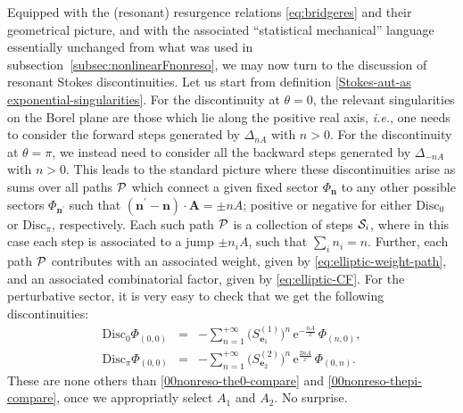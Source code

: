\documentclass[11pt,a4paper]{article}
\newcommand{\CP}{{\cal P}}
\newcommand{\CS}{{\cal S}}
\def\disc{{\mathrm{Disc}}}
\begin{document}
Equipped with the (resonant) resurgence relations \eqref{eq:bridgeres} and their geometrical picture, and with the associated ``statistical mechanical'' language essentially unchanged from what was used in subsection~\ref{subsec:nonlinearFnonreso}, we may now turn to the discussion of resonant Stokes discontinuities. Let us start from definition \eqref{Stokes-aut-as exponential-singularities}. For the discontinuity at $\theta=0$, the relevant singularities on the Borel plane are those which lie along the positive real axis, \textit{i.e.}, one needs to consider the forward steps generated by $\Delta_{nA}$ with $n>0$. For the discontinuity at $\theta=\pi$, we instead need to consider all the backward steps generated by $\Delta_{-nA}$ with $n>0$. This leads to the standard picture where these discontinuities arise as sums over all paths $\CP$ which connect a given fixed sector $\Phi_{\boldsymbol{n}}$ to any other possible sectors $\Phi_{\boldsymbol{n}^{\prime}}$ such that $\left( \boldsymbol{n}^{\prime}-\boldsymbol{n} \right) \cdot \boldsymbol{A} = \pm nA$; positive or negative for either $\disc_0$ or $\disc_\pi$, respectively. Each such path $\CP$ is a collection of steps $\CS_i$, where in this case each step is associated to a jump $\pm n_i A$, such that $\sum_i n_i = n$. Further, each path $\CP$ contributes with an associated weight, given by \eqref{eq:elliptic-weight-path}, and an associated combinatorial factor, given by \eqref{eq:elliptic-CF}. For the perturbative sector, it is very easy to check that we get the following discontinuities:
%
\begin{eqnarray}
\label{ell-pert-disc-0}
\disc_0 \Phi_{(0,0)} &=& - \sum_{n=1}^{+\infty} \big( S^{(1)}_{\boldsymbol{e}_1} \big)^n\, \mathrm{e}^{-\frac{n A}{x}}\, \Phi_{(n,0)}, \\
\label{ell-pert-disc-pi}
\disc_\pi \Phi_{(0,0)} &=& - \sum_{n=1}^{+\infty} \big( S^{(2)}_{\boldsymbol{e}_2} \big)^n\, \mathrm{e}^{\frac{2 n A}{x}}\, \Phi_{(0,n)}.
\end{eqnarray}
%
\noindent
These are none others than \eqref{00nonreso-the0-compare} and \eqref{00nonreso-thepi-compare}, once we appropriatly select $A_1$ and $A_2$. No surprise.
\end{document}
